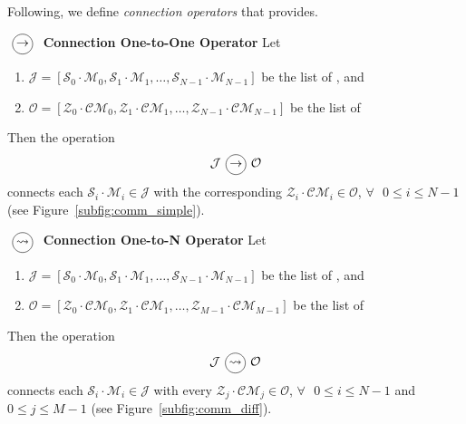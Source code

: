 
Following, we define \textit{connection operators} that \posl{} provides.

\begin{definition}\label{op_conn:1to1}
$\poslop{\rightarrow}$ {\bf Connection One-to-One Operator} Let 
\begin{enumerate}
\item $\mathcal{J} = \left[\mathcal{S}_0\cdot \mathcal{M}_0, \mathcal{S}_1\cdot \mathcal{M}_1,\dots, \mathcal{S}_{N-1}\cdot \mathcal{M}_{N-1}\right]$ be the list of \jacks, and
\item $\mathcal{O} = \left[\mathcal{Z}_0\cdot \mathcal{CM}_0, \mathcal{Z}_1\cdot \mathcal{CM}_1,\dots, \mathcal{Z}_{N-1}\cdot \mathcal{CM}_{N-1}\right]$ be the list of \outlets{}
\end{enumerate} Then the operation 
\[
\mathcal{J} \poslop{\rightarrow} \mathcal{O}
\]
connects each \jack{} $\mathcal{S}_i\cdot \mathcal{M}_i \in \mathcal{J}$ with the corresponding \outlet{} $\mathcal{Z}_i\cdot \mathcal{CM}_i \in \mathcal{O}$, $\forall\textbf{ }0 \leq i \leq N-1$ (see Figure~\ref{subfig:comm_simple}).
\end{definition}

\separation

\begin{definition}\label{op_conn:1ton}
$\poslop{\rightsquigarrow}$ {\bf Connection One-to-N Operator} Let 
\begin{enumerate} 
\item $\mathcal{J} = \left[\mathcal{S}_0\cdot \mathcal{M}_0, \mathcal{S}_1\cdot \mathcal{M}_1,\dots, \mathcal{S}_{N-1}\cdot \mathcal{M}_{N-1}\right]$ be the list of \jacks, and 
\item $\mathcal{O} = \left[\mathcal{Z}_0\cdot \mathcal{CM}_0, \mathcal{Z}_1\cdot \mathcal{CM}_1,\dots, \mathcal{Z}_{M-1}\cdot \mathcal{CM}_{M-1}\right]$ be the list of \outlets{} 
\end{enumerate} Then the operation 
\[
\mathcal{J} \poslop{\rightsquigarrow} \mathcal{O}
\]
connects each \jack{} $\mathcal{S}_i\cdot \mathcal{M}_i \in \mathcal{J}$ with every \outlet{} $\mathcal{Z}_j\cdot \mathcal{CM}_j \in \mathcal{O}$, $\forall\textbf{ }0 \leq i \leq N-1$ and $0 \leq j \leq M-1$ (see Figure~\ref{subfig:comm_diff}).
\end{definition}

